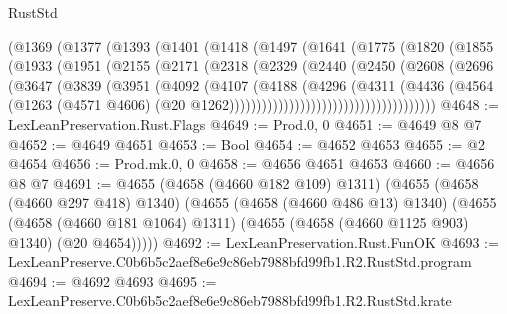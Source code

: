 \begin{lexlean}{RustStd}
\begin{coremodule}
                (@1369
                  (@1377
                    (@1393
                      (@1401
                        (@1418
                          (@1497
                            (@1641
                              (@1775
                                (@1820
                                  (@1855
                                    (@1933
                                      (@1951
                                        (@2155
                                          (@2171
                                            (@2318
                                              (@2329
                                                (@2440
                                                  (@2450
                                                    (@2608
                                                      (@2696
                                                        (@3647
                                                          (@3839
                                                            (@3951
                                                              (@4092
                                                                (@4107
                                                                  (@4188
                                                                    (@4296
                                                                      (@4311
                                                                        (@4436
                                                                          (@4564
                                                                            (@1263
                                                                              (@4571 @4606)
                                                                              (@20
                                                                                @1262))))))))))))))))))))))))))))))))))))))
@4648 := LexLeanPreservation.Rust.Flags
@4649 := Prod.{0, 0}
@4651 := @4649 @8 @7
@4652 := @4649 @4651
@4653 := Bool
@4654 := @4652 @4653
@4655 := @2 @4654
@4656 := Prod.mk.{0, 0}
@4658 := @4656 @4651 @4653
@4660 := @4656 @8 @7
@4691 := @4655
    (@4658 (@4660 @182 @109) @1311)
    (@4655
      (@4658 (@4660 @297 @418) @1340)
      (@4655
        (@4658 (@4660 @486 @13) @1340)
        (@4655
          (@4658 (@4660 @181 @1064) @1311)
          (@4655 (@4658 (@4660 @1125 @903) @1340) (@20 @4654)))))
@4692 := LexLeanPreservation.Rust.FunOK
@4693 := LexLeanPreserve.C0b6b5c2aef8e6e9c86eb7988bfd99fb1.R2.RustStd.program
@4694 := @4692 @4693
@4695 := LexLeanPreserve.C0b6b5c2aef8e6e9c86eb7988bfd99fb1.R2.RustStd.krate

\end{coremodule}
\end{lexlean}
